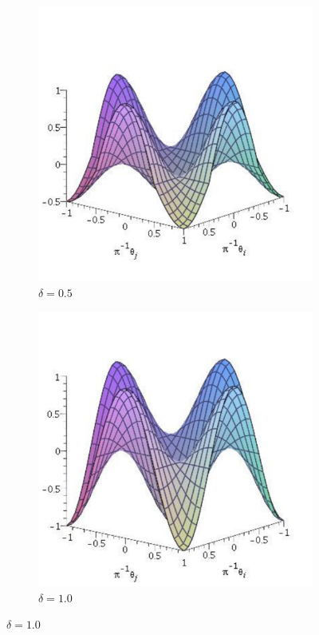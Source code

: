 \begin{figure}
\begin{subfigure}{0.31\textwidth }
    \includegraphics[width=\textwidth]{Figures/Vd5}
    \caption{$\delta = 0.5$}
\end{subfigure}    
%
\begin{subfigure}{0.31\textwidth }
    \centering
    \includegraphics[width=\textwidth]{Figures/Vd10}
    \caption{$\delta = 1.0$}
\end{subfigure}
%
\label{fig:Vd}
\end{figure}

